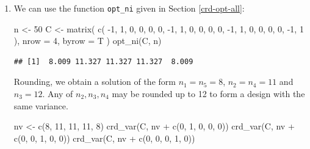 \documentclass[
]{book}
\newenvironment{Shaded}{\begin{snugshade}}{\end{snugshade}}
\newcommand{\AttributeTok}[1]{\textcolor[rgb]{0.77,0.63,0.00}{#1}}
\newcommand{\DecValTok}[1]{\textcolor[rgb]{0.00,0.00,0.81}{#1}}
\newcommand{\FunctionTok}[1]{\textcolor[rgb]{0.00,0.00,0.00}{#1}}
\newcommand{\NormalTok}[1]{#1}
\newcommand{\OtherTok}[1]{\textcolor[rgb]{0.56,0.35,0.01}{#1}}
\newcommand{\SpecialCharTok}[1]{\textcolor[rgb]{0.00,0.00,0.00}{#1}}
\theoremstyle{definition}
\theoremstyle{definition}
\theoremstyle{definition}
\theoremstyle{definition}
\theoremstyle{remark}
\begin{document}
\begin{enumerate}
\def\labelenumi{\alph{enumi}.}
\item
  We can use the function \texttt{opt\_ni} given in Section \ref{crd-opt-all}:

\begin{Shaded}
\begin{Highlighting}[]
\NormalTok{n }\OtherTok{\textless{}{-}} \DecValTok{50}
\NormalTok{C }\OtherTok{\textless{}{-}} \FunctionTok{matrix}\NormalTok{(}
  \FunctionTok{c}\NormalTok{(}
  \SpecialCharTok{{-}}\DecValTok{1}\NormalTok{, }\DecValTok{1}\NormalTok{, }\DecValTok{0}\NormalTok{, }\DecValTok{0}\NormalTok{, }\DecValTok{0}\NormalTok{,}
  \DecValTok{0}\NormalTok{, }\SpecialCharTok{{-}}\DecValTok{1}\NormalTok{, }\DecValTok{1}\NormalTok{, }\DecValTok{0}\NormalTok{, }\DecValTok{0}\NormalTok{,}
  \DecValTok{0}\NormalTok{, }\DecValTok{0}\NormalTok{, }\SpecialCharTok{{-}}\DecValTok{1}\NormalTok{, }\DecValTok{1}\NormalTok{, }\DecValTok{0}\NormalTok{,}
  \DecValTok{0}\NormalTok{, }\DecValTok{0}\NormalTok{, }\DecValTok{0}\NormalTok{, }\SpecialCharTok{{-}}\DecValTok{1}\NormalTok{, }\DecValTok{1}
\NormalTok{  ), }\AttributeTok{nrow =} \DecValTok{4}\NormalTok{, }\AttributeTok{byrow =}\NormalTok{ T}
\NormalTok{)}
\FunctionTok{opt\_ni}\NormalTok{(C, n) }
\end{Highlighting}
\end{Shaded}

\begin{verbatim}
## [1]  8.009 11.327 11.327 11.327  8.009
\end{verbatim}

  Rounding, we obtain a solution of the form \(n_1 = n_5 =8\), \(n_2 = n_4 = 11\) and \(n_3 = 12\). Any of \(n_2, n_3, n_4\) may be rounded up to 12 to form a design with the same variance.

\begin{Shaded}
\begin{Highlighting}[]
\NormalTok{nv }\OtherTok{\textless{}{-}} \FunctionTok{c}\NormalTok{(}\DecValTok{8}\NormalTok{, }\DecValTok{11}\NormalTok{, }\DecValTok{11}\NormalTok{, }\DecValTok{11}\NormalTok{, }\DecValTok{8}\NormalTok{)}
\FunctionTok{crd\_var}\NormalTok{(C, nv }\SpecialCharTok{+} \FunctionTok{c}\NormalTok{(}\DecValTok{0}\NormalTok{, }\DecValTok{1}\NormalTok{, }\DecValTok{0}\NormalTok{, }\DecValTok{0}\NormalTok{, }\DecValTok{0}\NormalTok{))}
\FunctionTok{crd\_var}\NormalTok{(C, nv }\SpecialCharTok{+} \FunctionTok{c}\NormalTok{(}\DecValTok{0}\NormalTok{, }\DecValTok{0}\NormalTok{, }\DecValTok{1}\NormalTok{, }\DecValTok{0}\NormalTok{, }\DecValTok{0}\NormalTok{))}
\FunctionTok{crd\_var}\NormalTok{(C, nv }\SpecialCharTok{+} \FunctionTok{c}\NormalTok{(}\DecValTok{0}\NormalTok{, }\DecValTok{0}\NormalTok{, }\DecValTok{0}\NormalTok{, }\DecValTok{1}\NormalTok{, }\DecValTok{0}\NormalTok{))}
\end{Highlighting}
\end{Shaded}


\end{enumerate}
\end{document}
